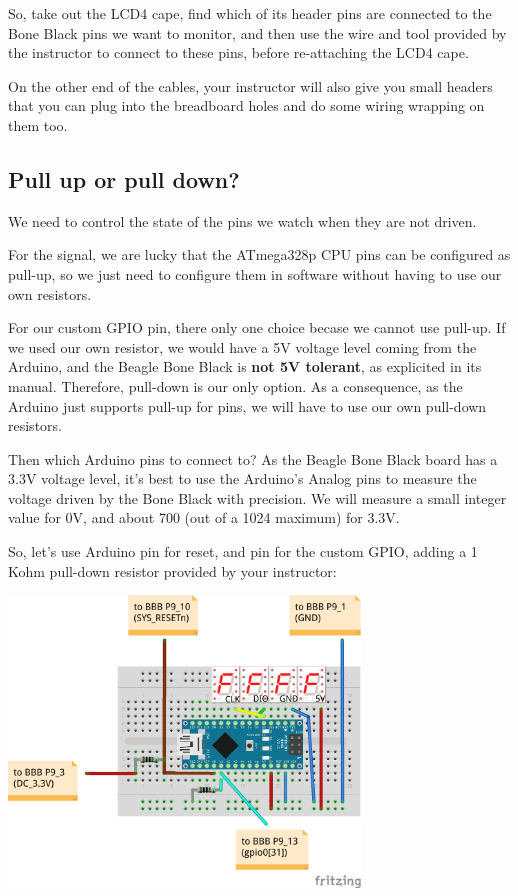 So, take out the LCD4 cape, find which of its header pins are connected
to the Bone Black pins we want to monitor, and then use the wire and
tool provided by the instructor to connect to these pins, before
re-attaching the LCD4 cape.

On the other end of the cables, your instructor will also give you small
headers that you can plug into the breadboard holes and do some wiring
wrapping on them too.

\subsection{Pull up or pull down?}

We need to control the state of the pins we watch when they are not
driven.

For the  signal, we are lucky that the ATmega328p CPU
pins can be configured as pull-up, so we just need to configure them
in software without having to use our own resistors.

For our custom GPIO pin, there only one choice becase we cannot use
pull-up. If we used our own resistor, we would have a 5V voltage level
coming from the Arduino, and the Beagle Bone Black is {\bf not 5V
tolerant}, as explicited in its manual. Therefore, pull-down is our only
option. As a consequence, as the Arduino just supports pull-up for
pins, we will have to use our own pull-down resistors.

Then which Arduino pins to connect to? As the Beagle Bone Black board
has a 3.3V voltage level, it's best to use the Arduino's Analog pins to
measure the voltage driven by the Bone Black with precision. We will measure a
small integer value for 0V, and about 700 (out of a 1024 maximum) for
3.3V.

So, let's use Arduino pin  for reset, and pin  for the
custom GPIO, adding a 1 Kohm pull-down resistor provided by your
instructor:

\begin{center}
\includegraphics[width=0.7\textwidth]{labs/boot-time-hardware-measurement/nano-final.png}
\end{center}

